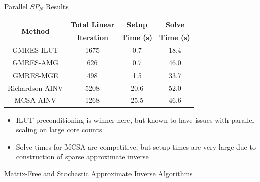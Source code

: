 \documentclass{beamer}
\begin{document}
\begin{frame}{Parallel $SP_N$ Results}
\begin{table}
\centering
\begin{tabular}{cccc}
\toprule
\multirow{2}{*}{\bfseries Method} &
\bfseries Total Linear & \bfseries Setup & \bfseries Solve \\
& \bfseries Iteration & \bfseries Time (s) & \bfseries Time (s) \\
\midrule
GMRES-ILUT      & 1675 & 0.7  & 18.4 \\
GMRES-AMG       & 626  & 0.7  & 46.0 \\
GMRES-MGE       & 498  & 1.5  & 33.7 \\
Richardson-AINV & 5208 & 20.6 & 52.0 \\
MCSA-AINV       & 1268 & 25.5 & 46.6 \\
\bottomrule
\end{tabular}
\end{table}
\begin{itemize}
  \item ILUT preconditioning is winner here, but known to have issues
    with parallel scaling on large core counts
  \item Solve times for MCSA are competitive, but setup times are very large
    due to construction of sparse approximate inverse
\end{itemize}
\end{frame}

\begin{frame}

  \center Matrix-Free and Stochastic Approximate Inverse Algorithms
  
\end{frame}
\end{document}
